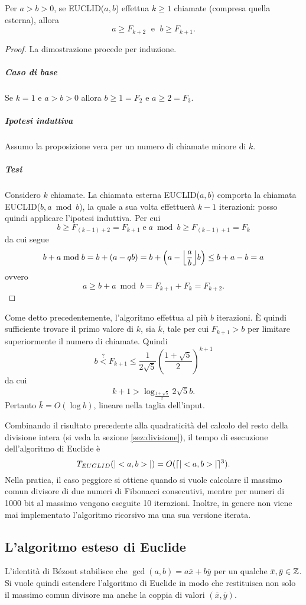 \begin{proposizione}
Per $a>b>0$, se EUCLID($a,b$) effettua $k\geq 1$ chiamate (compresa quella esterna), allora
\[
a\geq F_{k+2} \; \mbox{ e } \; b\geq F_{k+1}.
\]
\end{proposizione}
\begin{proof}
La dimostrazione procede per induzione.
\subparagraph{Caso di base} Se $k=1$ e $a>b>0$ allora $b\geq 1=F_2$ e $a\geq 2=F_3$.
\subparagraph{Ipotesi induttiva} Assumo la proposizione vera per un numero di chiamate minore di $k$.
\subparagraph{Tesi} Considero $k$ chiamate. La chiamata esterna EUCLID($a,b$) comporta la chiamata EUCLID($b,a\bmod b$), la quale a sua volta effettuerà $k-1$ iterazioni: posso quindi applicare l'ipotesi induttiva. Per cui
\[
b\geq F_{(k-1)+2}=F_{k+1} \; \mbox{e} \; a\bmod b \geq F_{(k-1)+1}=F_k
\]
da cui segue
\[
b+a\bmod b= b+(a-qb) = b +\left(a -\floor*{\frac{a}{b}}b\right) \leq b+a-b=a
\]
ovvero
\[
a \geq b+a\bmod b= F_{k+1} + F_k = F_{k+2}.
\]

\end{proof}

Come detto precedentemente, l'algoritmo effettua al più $b$ iterazioni. È quindi sufficiente trovare il primo valore di $k$, sia $\bar{k}$, tale per cui $F_{k+1}>b$ per limitare superiormente il numero di chiamate. Quindi
\[
b \overset{?}{<} F_{k+1} \leq \frac{1}{2\sqrt{5}}\left(\frac{1+\sqrt{5}}{2}\right)^{k+1}
\]
da cui
\[
k+1 > \log_{\frac{1+\sqrt{5}}{2}}{2\sqrt{5}b}.
\]
Pertanto $\bar{k}=O(\log b)$, lineare nella taglia dell'input.

Combinando il risultato precedente alla quadraticità del calcolo del resto della divisione intera (si veda la sezione \ref{sez:divisione}), il tempo di esecuzione dell'algoritmo di Euclide è
\[
T_{EUCLID}(|<a,b>|)=O(\lceil|<a,b>|\rceil^3).
\] 
Nella pratica, il caso peggiore si ottiene quando si vuole calcolare il massimo comun divisore di due numeri di Fibonacci consecutivi, mentre per numeri di 1000 bit al massimo vengono eseguite 10 iterazioni. Inoltre, in genere non viene mai implementato l'algoritmo ricorsivo ma una sua versione iterata.

\subsection{L'algoritmo esteso di Euclide}
L'identità di Bézout stabilisce che $\gcd(a,b)=a\bar{x}+b\bar{y}$ per un qualche $\bar{x},\bar{y}\in\operatorname*{\mathbb{Z}}$. Si vuole quindi estendere l'algoritmo di Euclide in modo che restituisca non solo il massimo comun divisore ma anche la coppia di valori $(\bar{x},\bar{y})$.

